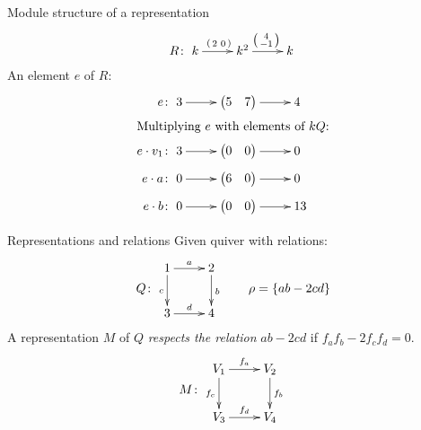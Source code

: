 \documentclass[usenames,dvipsnames]{beamer}
\newcommand{\defn}[1]{\textit{#1}}
\newcommand{\VV}[2]{\begin{pmatrix} #1 & #2 \end{pmatrix}}
\begin{document}
\begin{frame}{Module structure of a representation}
\[
R \colon
\xymatrix{
k   \ar[r]^{\left( \begin{smallmatrix} 2 & 0 \end{smallmatrix} \right)} &
k^2 \ar[r]^{\left( \begin{smallmatrix} 4 \\ -1 \end{smallmatrix} \right)} &
k
}
\]
An element $e$ of $R$:
\begin{align*}
e &\colon
\xymatrix{
3   \ar[r] &
{\VV{5}{7}} \ar[r] &
4
}
\\
\intertext{Multiplying $e$ with elements of $kQ$:}
e \cdot v_1 &\colon
\xymatrix{
3   \ar[r] &
{\VV{0}{0}} \ar[r] &
0
}
\\
e \cdot a &\colon
\xymatrix{
0   \ar[r] &
{\VV{6}{0}} \ar[r] &
0
}
\\
e \cdot b &\colon
\xymatrix{
0   \ar[r] &
{\VV{0}{0}} \ar[r] &
13
}
\end{align*}
\end{frame}

\begin{frame}{Representations and relations}
Given quiver with relations:
\[
Q \colon
\vcenter{\xymatrix{
1\ar[r]^a\ar[d]_c & 2\ar[d]^b\\
3\ar[r]^d & 4
}}
\qquad
\rho = \{ ab - 2cd \}
\]
A representation $M$ of $Q$ \defn{respects the relation}
$ab - 2cd$ if $f_a f_b - 2 f_c f_d = 0$.
\[
M \colon
\vcenter{\xymatrix{
V_1 \ar[r]^{f_a} \ar[d]_{f_c} &
V_2 \ar[d]^{f_b} \\
V_3 \ar[r]^{f_d} &
V_4
}}
\]
\end{frame}
\end{document}

